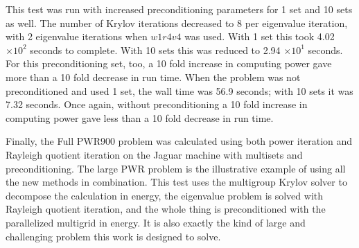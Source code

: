 This test was run with increased preconditioning parameters for 1 set and 10 sets as well. The number of Krylov iterations decreased to 8 per eigenvalue iteration, with 2 eigenvalue iterations when $w1r4v4$ was used. With 1 set this took 4.02 $\times 10^{2}$ seconds to complete. With 10 sets this was reduced to 2.94 $\times 10^{1}$ seconds. For this preconditioning set, too, a 10 fold increase in computing power gave more than a 10 fold decrease in run time. When the problem was not preconditioned and used 1 set, the wall time was 56.9 seconds; with 10 sets it was 7.32 seconds. Once again, without preconditioning a 10 fold increase in computing power gave less than a 10 fold decrease in run time. 
 
Finally, the Full PWR900 problem was calculated using both power iteration and Rayleigh quotient iteration on the Jaguar machine with multisets and preconditioning. The large PWR problem is the illustrative example of using all the new methods in combination. This test uses the multigroup Krylov solver to decompose the calculation in energy, the eigenvalue problem is solved with Rayleigh quotient iteration, and the whole thing is preconditioned with the parallelized multigrid in energy. It is also exactly the kind of large and challenging problem this work is designed to solve. %

